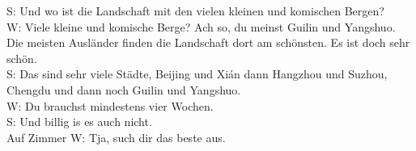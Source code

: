 S: Und wo ist die Landschaft  mit den vielen kleinen und komischen Bergen? \\
W: Viele kleine und komische Berge? Ach so, du meinst Guilin und Yangshuo.
Die meisten Ausländer finden die Landschaft dort am schönsten.
Es ist doch sehr schön. \\
S: Das sind sehr viele Städte, Beijing und Xi\'an dann Hangzhou und Suzhou, Chengdu und dann noch Guilin und Yangshuo. \\
W: Du brauchst mindestens vier Wochen.  \\
S: Und billig is es auch nicht.  \\Auf Zimmer
W: Tja, such dir das beste aus.

